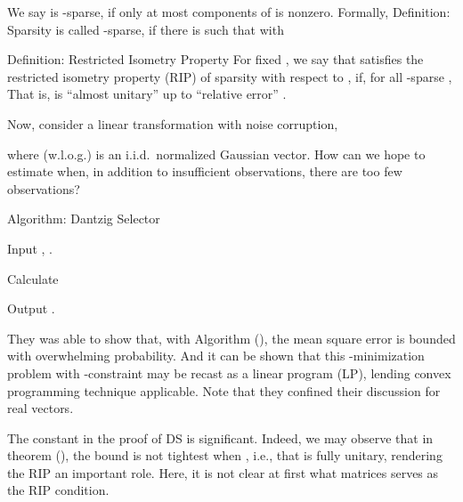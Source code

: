 We say  is -sparse, if only at most  components of  is nonzero.
Formally,
\Result
{Definition: Sparsity}
{
 is called -sparse, if there is  such that
with
}

\Result
{Definition: Restricted Isometry Property}
{
For fixed , we say that \m {\M{\Phi}} satisfies the restricted isometry property (RIP) of sparsity  with respect to , if, for all -sparse ,
}
That is, \m {\Phi} is ``almost unitary'' up to ``relative error'' .

Now, consider a linear transformation with noise corruption,


where (w.l.o.g.)  is an i.i.d.\ normalized Gaussian vector.
How can we hope to estimate  when, in addition to insufficient observations, there are too few observations?

\Result
{Algorithm: Dantzig Selector}
{
\startitemize[n]
\item Input , .
\item Calculate
\item Output .
}

They was able to show that, with Algorithm (), the mean square error is bounded with overwhelming probability.
And it can be shown that this -minimization problem with \m {\ell_\infty}-constraint may be recast as a linear program (LP), lending convex programming technique applicable.
Note that they confined their discussion for real vectors.

The constant \m {\d} in the proof of DS is significant.
Indeed, we may observe that in theorem (), the bound is not tightest when , i.e., that \m {\Phi} is fully unitary, rendering the RIP an important role.
Here, it is not clear at first what matrices serves as the RIP condition.

